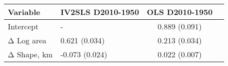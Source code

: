 \begin{tabular}{llcr}
\toprule
Variable & IV2SLS D2010-1950 & OLS D2010-1950 \\
\midrule
Intercept & - & 0.889 (0.091) \\
Δ Log area & 0.621 (0.034) & 0.213 (0.034) \\
Δ Shape, km & -0.073 (0.024) & 0.022 (0.007) \\
\bottomrule
\end{tabular}
